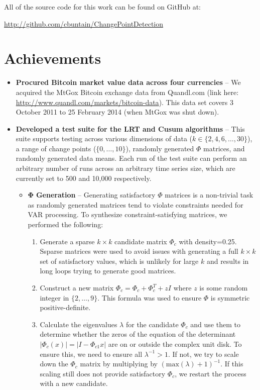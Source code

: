 \documentclass[10pt,letterpaper]{article}
\begin{document}
\maketitle

All of the source code for this work can be found on GitHub at:

\url{http://github.com/cbuntain/ChangePointDetection}

\section{Achievements}

\begin{itemize}
\item \textbf{Procured Bitcoin market value data across four currencies} -- We acquired the MtGox Bitcoin exchange data from Quandl.com (link here: \url{http://www.quandl.com/markets/bitcoin-data}). This data set covers 3 October 2011 to 25 February 2014 (when MtGox was shut down).
\item \textbf{Developed a test suite for the LRT and Cusum algorithms} -- This suite supports testing across various dimensions of data ($k \in \{2,4,6,\ldots,30\}$), a range of change points ($\{0,\ldots,10\}$), randomly generated $\Phi$ matrices, and randomly generated data means. Each run of the test suite can perform an arbitrary number of runs across an arbitrary time series size, which are currently set to 500 and 10,000 respectively.
\begin{itemize}
\item $\mathbf{\Phi}$ \textbf{Generation} -- Generating satisfactory $\Phi$ matrices is a non-trivial task as randomly generated matrices tend to violate constraints needed for VAR processing. To synthesize constraint-satisfying matrices, we performed the following:

\begin{enumerate}
\item Generate a sparse $k \times k$ candidate matrix $\Phi_c$ with density=0.25. Ssparse matrices were used to avoid issues with generating a full $k \times k$ set of satisfactory values, which is unlikely for large $k$ and results in long loops trying to generate good matrices.
\item Construct a new matrix $\Phi_c = \Phi_c + \Phi_c^T + zI$ where $z$ is some random integer in $\{2,\ldots,9\}$. This formula was used to ensure $\Phi$ is symmetric positive-definite.
\item Calculate the eigenvalues $\lambda$ for the candidate $\Phi_c$ and use them to determine whether the zeros of the equation of the determinant $|\Phi_c(x)| = |I - \Phi_{c1}x|$ are on or outside the complex unit disk. To ensure this, we need to ensure all $\lambda^{-1} > 1$. If not, we try to scale down the $\Phi_c$ matrix by multiplying by $(\text{max}(\lambda)+1)^{-1}$. If this scaling still does not provide satisfactory $\Phi_c$, we restart the process with a new candidate.
\end{enumerate}


\end{itemize}
\end{itemize}
\end{document}
